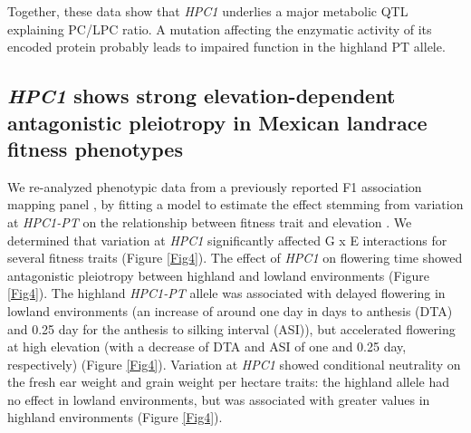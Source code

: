 \documentclass[9pt,twocolumn,twoside,lineno]{BioRxiv}
\begin{document}
Together, these data show that \textit{HPC1} underlies a major metabolic QTL explaining PC/LPC ratio. A mutation affecting the enzymatic activity of its encoded protein probably leads to impaired function in the highland PT allele.  

\subsection{\textit{HPC1} shows strong elevation-dependent antagonistic pleiotropy in Mexican landrace fitness phenotypes} 
We re-analyzed phenotypic data from a previously reported F1 association mapping panel \cite{Romero_Navarro2017-cn} \cite{Gates2019-xu}, by fitting a model to estimate the effect stemming from variation at \textit{HPC1-PT} on the relationship between fitness trait and elevation \cite{Runcie2019-Gr}. 
We determined that variation at \textit{HPC1} significantly affected G x E interactions for several fitness traits (Figure \ref{Fig4}). 
The effect of \textit{HPC1} on flowering time showed antagonistic pleiotropy between highland and lowland environments (Figure \ref{Fig4}). 
The highland \textit{HPC1-PT} allele was associated with delayed flowering in lowland environments (an increase of around one day in days to anthesis (DTA)  and 0.25 day for the  anthesis to silking interval (ASI)), but accelerated flowering at high elevation (with a decrease of DTA and ASI of one and 0.25 day, respectively) (Figure \ref{Fig4}).
Variation at \textit{HPC1} showed conditional neutrality on the fresh ear weight and grain weight per hectare traits: the highland allele had no effect in lowland environments, but was associated with greater values in highland environments (Figure \ref{Fig4}).
\end{document}
